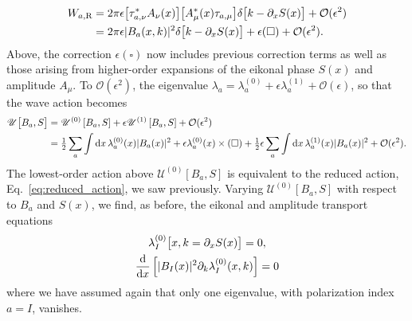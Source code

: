 %
\begin{equation}
  \begin{aligned}
    W_{a,\text{R}} &= 2\pi \epsilon\big[\tau_{a,\nu}^{*} A_{\nu}(x)\big]\big[A^{*}_{\mu}(x)\tau_{a,\mu}\big]\delta\big[k - \partial_{x}S(x)\big] + \mathcal{O}(\epsilon^{2})\\
                   &= 2\pi\epsilon \abs{B_{a}(x, k)}^{2}\delta\big[k - \partial_{x}S(x)\big] + \epsilon(\square) + \mathcal{O}(\epsilon^{2}).
  \end{aligned}
\end{equation}
%
Above, the correction $\epsilon(\square)$ now includes previous correction terms as well as those arising from higher-order expansions of the eikonal phase $S(x)$ and amplitude $A_{\mu}$.
To $\mathcal{O}(\epsilon^{2})$, the eigenvalue $\lambda_{a} = \lambda_{a}^{(0)} + \epsilon\lambda_{a}^{(1)} + \mathcal{O}(\epsilon)$, so that the wave action becomes
%
\begin{equation}
  \begin{aligned}
    \mathscr{U}\big[B_{a}, S\big] &= \mathscr{U}^{(0)}\left[B_{a}, S\right] + \epsilon\mathscr{U}^{(1)}\left[B_{a}, S\right] + \mathcal{O}(\epsilon^{2})\\
                                  &= \tfrac{1}{2} \sum_{a} \int \dd{x}\, \lambda_{a}^{(0)}(x)\abs{B_{a}(x)}^{2} + \epsilon\lambda_{a}^{(0)}(x)\times(\square) + \tfrac{1}{2}\epsilon\sum_{a}\int\dd{x}\,\lambda_{a}^{(1)}(x)\abs{B_{a}(x)}^{2} + \mathcal{O}(\epsilon^{2}).
  \end{aligned}
  \label{eq:action_ho}
\end{equation}
%
The lowest-order action above $\mathscr{U}^{(0)}[B_{a}, S]$ is equivalent to the reduced action, Eq.~\eqref{eq:reduced_action}, we saw previously.
Varying $\mathscr{U}^{(0)}[B_{a}, S]$ with respect to $B_{a}$ and $S(x)$, we find, as before, the eikonal and amplitude transport equations
%
\begin{equation}
  \begin{gathered}
    \lambda_{I}^{(0)}\big[x, k=\partial_{x}S(x)\big] = 0,\\
\frac{\dd}{\dd{x}}\left[\abs{B_{I}(x)}^{2}\partial_{k}\lambda^{(0)}_{I}(x, k)\right] = 0
  \end{gathered}
\end{equation}
%
where we have assumed again that only one eigenvalue, with polarization index $a = I$, vanishes.

